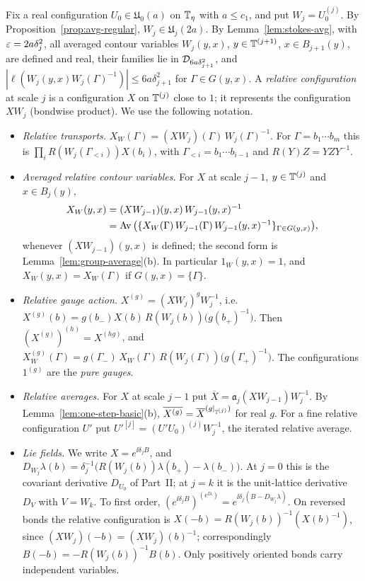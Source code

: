 Fix a real configuration $U_0\in\mathfrak U_0(a)$ on $\mathbb T_\eta$ with $a\le c_1$, and put $W_j=U_0^{(j)}$. By Proposition~\ref{prop:avg-regular}, $W_j\in\mathfrak U_j(2a)$. By Lemma~\ref{lem:stokes-avg}, with $\varepsilon=2a\delta_j^2$, all averaged contour variables $W_j(y,x)$, $y\in\mathbb T^{(j+1)}$, $x\in B_{j+1}(y)$, are defined and real, their families lie in $\mathcal D_{6a\delta_{j+1}^2}$, and $|\ell(W_j(y,x)W_j(\Gamma)^{-1})|\le6a\delta_{j+1}^2$ for $\Gamma\in G(y,x)$. A \emph{relative configuration} at scale $j$ is a configuration $X$ on $\mathbb T^{(j)}$ close to $1$; it represents the configuration $XW_j$ (bondwise product). We use the following notation.
\begin{itemize}
\item \emph{Relative transports.} $X_W(\Gamma)=(XW_j)(\Gamma)\,W_j(\Gamma)^{-1}$. For $\Gamma=b_1\cdots b_m$ this is $\prod_iR(W_j(\Gamma_{<i}))X(b_i)$, with $\Gamma_{<i}=b_1\cdots b_{i-1}$ and $R(Y)Z=YZY^{-1}$.
\item \emph{Averaged relative contour variables.} For $X$ at scale $j-1$, $y\in\mathbb T^{(j)}$ and $x\in B_j(y)$,
\[
\begin{aligned}
X_W(y,x)&=(XW_{j-1})(y,x)\,W_{j-1}(y,x)^{-1}\\
&=\operatorname{Av}\big(\{X_W(\Gamma)\,W_{j-1}(\Gamma)\,W_{j-1}(y,x)^{-1}\}_{\Gamma\in G(y,x)}\big),
\end{aligned}
\]
whenever $(XW_{j-1})(y,x)$ is defined; the second form is Lemma~\ref{lem:group-average}(b). In particular $1_W(y,x)=1$, and $X_W(y,x)=X_W(\Gamma)$ if $G(y,x)=\{\Gamma\}$.
\item \emph{Relative gauge action.} $X^{(g)}=(XW_j)^gW_j^{-1}$, i.e.\ $X^{(g)}(b)=g(b_-)X(b)\,R(W_j(b))\big(g(b_+)^{-1}\big)$. Then $(X^{(g)})^{(h)}=X^{(hg)}$, and $X^{(g)}_W(\Gamma)=g(\Gamma_-)\,X_W(\Gamma)\,R(W_j(\Gamma))\big(g(\Gamma_+)^{-1}\big)$. The configurations $1^{(g)}$ are the \emph{pure gauges}.
\item \emph{Relative averages.} For $X$ at scale $j-1$ put $\overline X=\mathfrak a_j(XW_{j-1})W_j^{-1}$. By Lemma~\ref{lem:one-step-basic}(b), $\overline{X^{(g)}}=\overline X^{(g|_{\mathbb T^{(j)}})}$ for real $g$. For a fine relative configuration $U'$ put $U'^{[j]}=(U'U_0)^{(j)}W_j^{-1}$, the iterated relative average.
\item \emph{Lie fields.} We write $X=e^{\ii\delta_jB}$, and $D_{W_j}\lambda(b)=\delta_j^{-1}\big(R(W_j(b))\lambda(b_+)-\lambda(b_-)\big)$. At $j=0$ this is the covariant derivative $D_{U_0}$ of Part~II; at $j=k$ it is the unit-lattice derivative $D_V$ with $V=W_k$. To first order, $(e^{\ii\delta_jB})^{(e^{\ii\lambda})}=e^{\ii\delta_j(B-D_{W_j}\lambda)}$. On reversed bonds the relative configuration is $X(-b)=R(W_j(b))^{-1}(X(b)^{-1})$, since $(XW_j)(-b)=(XW_j)(b)^{-1}$; correspondingly $B(-b)=-R(W_j(b))^{-1}B(b)$. Only positively oriented bonds carry independent variables.
\end{itemize}
